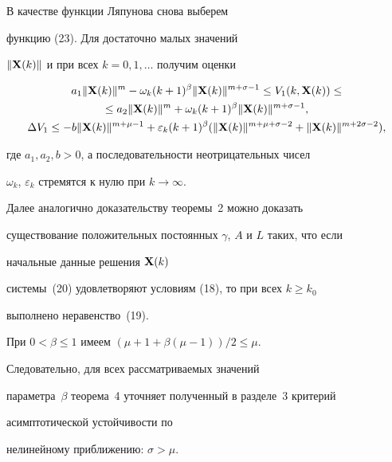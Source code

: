 \begin{pf}


В качестве функции Ляпунова снова выберем


функцию (23). Для достаточно малых значений


$\|\bold X(k)\|$ и при всех $k=0,1,\dotsc$ получим оценки


\begin{gather*}


a_1 \|\bold X(k)\|^{m}-\omega_k (k+1)^\beta


\|\bold X(k)\|^{m+\sigma-1}\leq V_1(k, \bold X(k))\leq\\


%


\leq a_2 \|\bold X(k)\|^{m}+\omega_k (k+1)^\beta


\|\bold X(k)\|^{m+\sigma-1},\\


%


\Delta V_1\leq -b \|\bold X(k)\|^{m+\mu-1}+ \varepsilon_k


(k+1)^\beta (\|\bold X(k)\|^{m+ \mu+\sigma-2}+


\|\bold X(k)\|^{m+2 \sigma-2}),


\end{gather*}


где $a_1, a_2, b>0$, а последовательности неотрицательных чисел


$\omega_k$, $\varepsilon_k$ стремятся к нулю при $k\to \infty$.





Далее аналогично доказательству теоремы~2 можно доказать


существование положительных постоянных $\gamma$, $A$ и $L$ таких, что если


начальные данные решения $\bold X(k)$


системы~(20) удовлетворяют условиям (18), то при всех $k\geq k_0$


выполнено неравенство~(19).


\end{pf}








\begin{note}


При $0< \beta \leq 1$ имеем $(\mu+1+\beta(\mu-1))/2\leq \mu$. 


Следовательно, для всех рассматриваемых значений


параметра~$\beta$ теорема~4 уточняет полученный в разделе~3 критерий


асимптотической устойчивости по


нелинейному приближению: $\sigma>\mu$.


\end{note}






